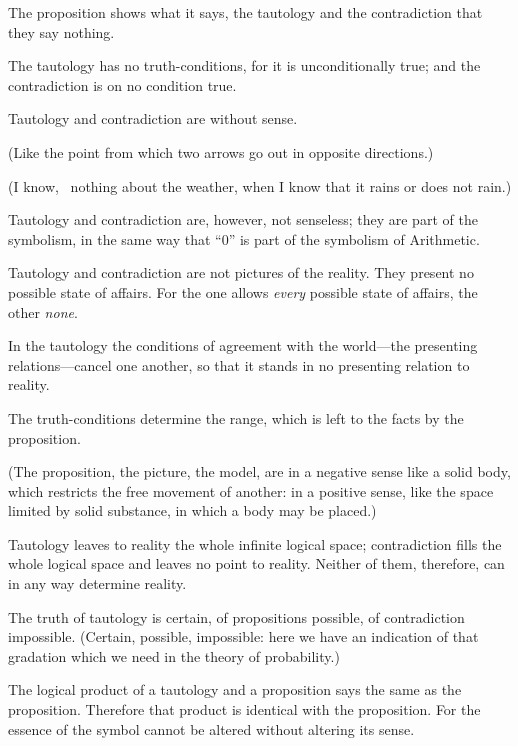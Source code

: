 {The proposition shows what it says, the
tautology and the contradiction that they say
nothing.

The tautology has no truth-conditions, for it is
unconditionally true; and the contradiction is on
no condition true.

Tautology and contradiction are without sense.

(Like the point from which two arrows go out in
opposite directions.)

(I know, \exempliGratia\ nothing about the weather, when
I know that it rains or does not rain.)}


{Tautology and contradiction are, however, not
senseless; they are part of the symbolism, in the
same way that ``0'' is part of the symbolism of
Arithmetic.}


{Tautology and contradiction are not pictures of
the reality. They present no possible state of
affairs. For the one allows \emph{every} possible state
of affairs, the other \emph{none}.

In the tautology the conditions of agreement
with the world\AllowBreak---the presenting re\-la\-tions---cancel
one another, so that it stands in no presenting
relation to reality.}


{The truth-conditions determine the range, which
is left to the facts by the proposition.

(The proposition, the picture, the model, are in
a negative sense like a solid body, which restricts
the free movement of another: in a positive sense,
like the space limited by solid substance, in which
a body may be placed.)

Tautology leaves to reality the whole infinite
logical space; contradiction fills the whole logical
space and leaves no point to reality. Neither of
them, therefore, can in any way determine
reality.}


{The truth of tautology is certain, of propositions
possible, of contradiction impossible. (Certain,
possible, impossible: here we have an indication
of that gradation which we need in the theory of
probability.)}


{The logical product of a tautology and a proposition
says the same as the proposition. Therefore
that product is identical with the proposition.
For the essence of the symbol cannot be altered
without altering its sense.}


